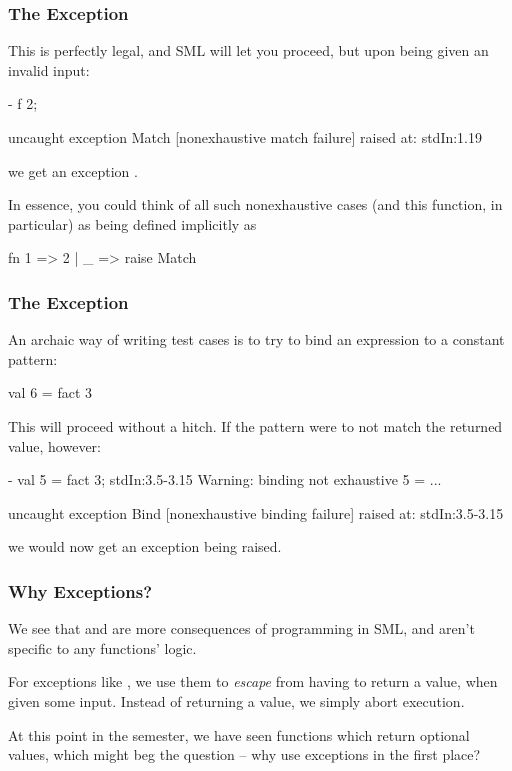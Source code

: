 \documentclass[aspectratio=169]{beamer}
\begin{document}
\begin{frame}[fragile]
  \frametitle{The  Exception}

  This is perfectly legal, and SML will let you proceed, but upon being given
  an invalid input:
  \pause
  \begin{codeblock}
    - f 2;

    uncaught exception Match [nonexhaustive match failure]
      raised at: stdIn:1.19
  \end{codeblock}
  we get an exception .

  \pause
  \vspace{\fill}

  In essence, you could think of all such nonexhaustive cases (and this function,
  in particular) as being defined implicitly as
  \pause
  \begin{codeblock}
    fn 1 => 2 | _ => raise Match
  \end{codeblock}
\end{frame}

\begin{frame}[fragile]
  \frametitle{The  Exception}

  An archaic way of writing test cases is to try to bind an expression to a
  constant pattern:
  \begin{codeblock}
    val 6 = fact 3
  \end{codeblock}

  \pause
  \vspace{\fill}

  This will proceed without a hitch. If the pattern were to not match the
  returned value, however:

  \begin{codeblock}
    - val 5 = fact 3;
    stdIn:3.5-3.15 Warning: binding not exhaustive
              5 = ...

    uncaught exception Bind [nonexhaustive binding failure]
      raised at: stdIn:3.5-3.15
  \end{codeblock}

  we would now get an exception  being raised.
\end{frame}

\begin{frame}[fragile]
  \frametitle{Why Exceptions?}

  We see that  and  are more consequences
  of programming in SML, and aren't specific to any functions' logic.

  \pause
  \vspace{\fill}
  
  For exceptions like , we use them to \textit{escape} from
  having to return a value, when given some input. Instead of returning
  a value, we simply abort execution.

  \pause
  \vspace{\fill}

  At this point in the semester, we have seen functions which return
  optional values, which might beg the question -- why use exceptions
  in the first place?
\end{frame}
\end{document}
